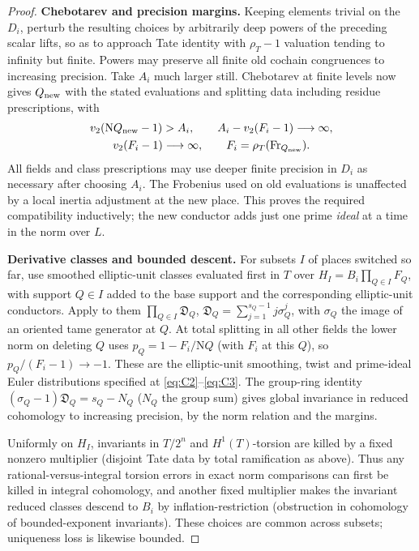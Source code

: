 \begin{proof}
\par\smallskip\noindent\textbf{Chebotarev and precision margins.}\enspace
Keeping elements trivial on the \(D_i\), perturb the resulting choices by arbitrarily deep
powers of the preceding scalar lifts, so as to approach Tate identity with \(\rho_T-1\)
valuation tending to infinity but finite. Powers may preserve all finite old cochain
congruences to increasing precision. Take \(A_i\) much larger still. Chebotarev at finite
levels now gives \(Q_{\rm new}\) with the stated evaluations and splitting data including
residue prescriptions, with
\begin{equation}\label{cm:eq:precision}
\begin{gathered}
 v_2(\mathrm NQ_{\rm new}-1)>A_i,\qquad
 A_i-v_2(F_i-1)\longrightarrow\infty,\\
 v_2(F_i-1)\longrightarrow\infty,\qquad
 F_i=\rho_T(\mathrm{Fr}_{Q_{\rm new}}).
 \end{gathered}
\end{equation}
All fields and class prescriptions may use deeper finite precision in \(D_i\) as necessary
after choosing \(A_i\). The Frobenius used on old evaluations is unaffected by a local inertia
adjustment at the new place. This proves the required compatibility inductively; the new
conductor adds just one prime \emph{ideal} at a time in the norm over \(L\).

\par\smallskip\noindent\textbf{Derivative classes and bounded descent.}\enspace
For subsets \(I\) of places switched so far, use smoothed elliptic-unit classes evaluated
first in \(T\) over \(H_I=B_i\prod_{Q\in I}F_Q\), with support \(Q\in I\) added to the base
support and the corresponding elliptic-unit conductors. Apply to them \(\prod_{Q\in
I}\mathfrak D_Q\), \(\mathfrak D_Q=\sum_{j=1}^{s_Q-1} j\sigma_Q^j\), with \(\sigma_Q\) the
image of an oriented tame generator at \(Q\). At total splitting in all other fields the lower
norm on deleting \(Q\) uses \(p_Q=1-F_i/\mathrm N Q\) (with \(F_i\) at this \(Q\)), so
\(p_Q/(F_i-1)\to-1\). These are the elliptic-unit smoothing, twist and prime-ideal Euler
distributions specified at \eqref{eq:C2}–\eqref{eq:C3}. The group-ring identity
\((\sigma_Q-1)\mathfrak D_Q=s_Q-N_Q\) (\(N_Q\) the group sum) gives global invariance in
reduced cohomology to increasing precision, by the norm relation and the margins.

Uniformly on \(H_I\), invariants in \(T/2^n\) and \(H^1(T)\)-torsion are killed by a fixed
nonzero multiplier (disjoint Tate data by total ramification as above). Thus any
rational-versus-integral torsion errors in exact norm comparisons can first be killed in
integral cohomology, and another fixed multiplier makes the invariant reduced classes descend
to \(B_i\) by inflation-restriction (obstruction in cohomology of bounded-exponent
invariants). These choices are common across subsets; uniqueness loss is likewise bounded.


\end{proof}
